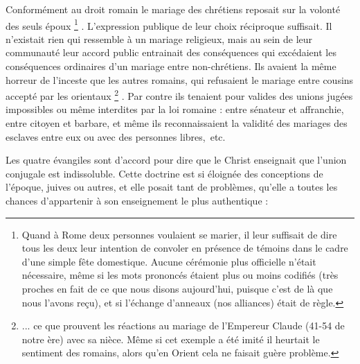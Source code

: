  Conformément au droit romain le mariage des chrétiens reposait sur la volonté des seuls époux%
\footnote{Quand à Rome deux personnes voulaient se marier, il leur suffisait de dire tous les deux leur intention de convoler en présence de témoins dans le cadre d'une simple fête domestique. Aucune cérémonie plus officielle n'était nécessaire, même si les mots prononcés étaient plus ou moins codifiés (très proches en fait de ce que nous disons aujourd'hui, puisque c'est de là que nous l'avons reçu), et si l'échange d'anneaux (nos alliances) était de règle.}%
. L'expression publique de leur choix réciproque suffisait. Il n'existait rien qui ressemble à un mariage religieux, mais au sein de leur communauté leur accord public entrainait des conséquences qui excédaient les conséquences ordinaires d'un mariage entre non-chrétiens. Ils avaient la même horreur de l'inceste que les autres romains, qui refusaient le mariage entre cousins accepté par les orientaux%
\footnote{... ce que prouvent les réactions au mariage de l'Empereur Claude (41-54 de notre ère) avec sa nièce. Même si cet exemple a été imité il heurtait le sentiment des romains, alors qu'en Orient cela ne faisait guère problème.}%
. Par contre ils tenaient pour valides des unions jugées impossibles ou même interdites par la loi romaine : entre sénateur et affranchie, entre citoyen et barbare, et même ils reconnaissaient la validité des mariages des esclaves entre eux ou avec des personnes libres,~etc.

Les quatre évangiles sont d'accord pour dire que le Christ enseignait que l'union conjugale est indissoluble. Cette doctrine est si éloignée des conceptions de l'époque, juives ou autres, et elle posait tant de problèmes, qu'elle a toutes les chances d'appartenir à son enseignement le plus authentique :

